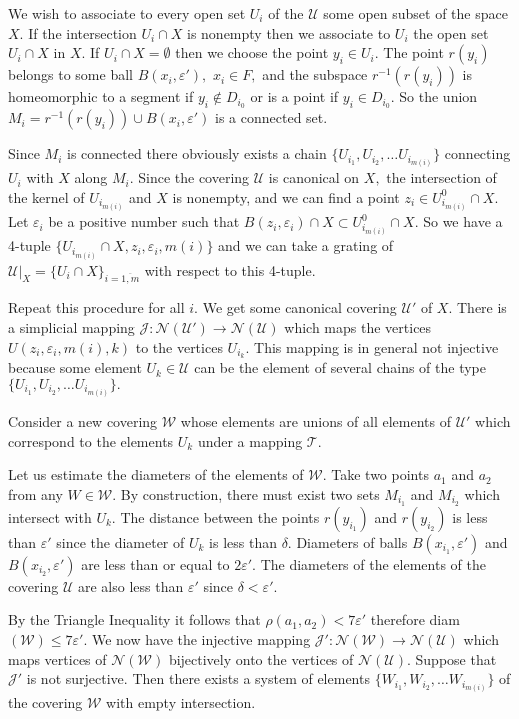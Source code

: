 We wish to associate to every open set $U_i$ of the $\mathcal{U}$
some open subset of the space $X.$ If the intersection $U_i\cap X$
is nonempty then we associate to $U_i$ the open set $U_i\cap X$ in
$X.$ If $U_i\cap X = \emptyset$ then we choose the point $y_i \in
U_i.$ The point $r(y_i)$ belongs to some ball $B(x_{i},
\varepsilon'),$ $x_i\in F,$ and the subspace $r^{-1}(r(y_i))$ is
homeomorphic to a segment if $y_i \notin D_{i_0}$ or is a point if
$y_i \in D_{i_0}.$ So the union $M_i = r^{-1}(r(y_i)) \cup B(x_i,
\varepsilon')$ is a connected set. 

Since $M_i$ is connected there obviously
exists  a chain $\{U_{i_1}, U_{i_2},\dots U_{i_{m(i)}}\}$
connecting $U_i$  with $X$ along $M_i.$ Since the covering
$\mathcal{U}$ is canonical on $X,$ the intersection of the kernel
of $U_{i_{m(i)}}$ and $X$ is nonempty, and we can find a point
$z_i \in U_{i_{m(i)}}^0\cap X.$ Let $\varepsilon_i$ be a positive
number such that $B(z_i, \varepsilon_i)\cap X\subset
U_{i_{m(i)}}^0\cap X.$ So we have a 4-tuple $\{U_{i_{m(i)}}\cap X,
z_i, \varepsilon_i, m(i)\}$ and we can take a grating of
$\mathcal{U}|_X = \{U_i\cap X\}_{i=\overline{1,m}}$ with respect
to this 4-tuple.

Repeat this procedure for all $i.$ We get some canonical covering
$\mathcal{U}'$ of $X.$ There is a simplicial mapping $\mathcal{J}:
\mathcal{N}(\mathcal{U}')\to \mathcal{N}(\mathcal{U})$ which maps
the vertices $U(z_i, \varepsilon_i, m(i), k)$ to the vertices
$U_{i_k}.$ This mapping is in general not injective because some
element $U_k\in \mathcal{U}$ can be the element of several chains
of the type $\{U_{i_1}, U_{i_2},\dots U_{i_{m(i)}}\}.$ 

Consider a
new covering $\mathcal{W}$ whose 
elements are unions of all
elements of $\mathcal{U}'$ which correspond to the elements $U_k$
under a mapping $\mathcal{T}.$

Let us estimate the diameters of the elements of $\mathcal{W}$.
Take two points $a_1$ and $a_2$ from any $W \in \mathcal{W}$. By
construction, there must exist two sets $M_{i_1}$ and $M_{i_2}$
which intersect with $U_k.$ The distance between the points
$r(y_{i_1})$ and $r(y_{i_2})$ is less than $\varepsilon'$ since
the diameter of $U_k$ is less than $\delta.$ Diameters of balls
$B(x_{i_1}, \varepsilon')$ and $B(x_{i_2}, \varepsilon')$ are less
than or equal to $2\varepsilon'.$  The diameters of the elements
of the covering $\mathcal{U}$ are also less than $\varepsilon'$
since $\delta < \varepsilon'.$ 

By the Triangle Inequality it
follows that $\rho (a_1, a_2) < 7\varepsilon'$ therefore
diam$(\mathcal{W})\leq 7\varepsilon'$. We now have the injective
mapping $\mathcal{J}': \mathcal{N}(\mathcal{W}) \to
\mathcal{N}(\mathcal{U})$ which maps vertices of
$\mathcal{N}(\mathcal{W})$ bijectively onto the vertices of
$\mathcal{N}(\mathcal{U}).$ Suppose that $\mathcal{J}'$ is not
surjective. Then there exists a system of elements $\{W_{i_1},
W_{i_2},\dots W_{i_{m(i)}}\}$ of the covering $\mathcal{W}$ with
empty intersection. 

